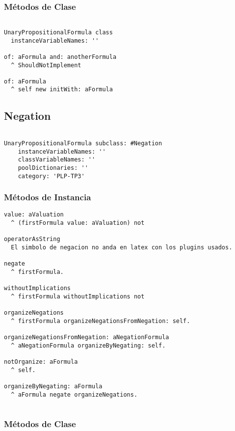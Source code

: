 \documentclass[spanish, 10pt,a4paper]{article}
\numberwithin{equation}{section} %
\begin{document}
\subsubsection{Métodos de Clase}
\begin{lstlisting}
 
UnaryPropositionalFormula class
  instanceVariableNames: ''

of: aFormula and: anotherFormula
  ^ ShouldNotImplement

of: aFormula
  ^ self new initWith: aFormula
\end{lstlisting}

\subsection{Negation}

\begin{lstlisting}

UnaryPropositionalFormula subclass: #Negation
	instanceVariableNames: ''
	classVariableNames: ''
	poolDictionaries: ''
	category: 'PLP-TP3'

\end{lstlisting}

\subsubsection{Métodos de Instancia}
\begin{lstlisting}
value: aValuation
  ^ (firstFormula value: aValuation) not

operatorAsString
  El simbolo de negacion no anda en latex con los plugins usados.

negate
  ^ firstFormula.

withoutImplications 
  ^ firstFormula withoutImplications not

organizeNegations
  ^ firstFormula organizeNegationsFromNegation: self.

organizeNegationsFromNegation: aNegationFormula
  ^ aNegationFormula organizeByNegating: self.

notOrganize: aFormula
  ^ self.

organizeByNegating: aFormula
  ^ aFormula negate organizeNegations.


\end{lstlisting}

\subsubsection{Métodos de Clase}
\end{document}
